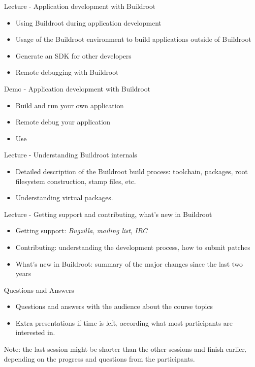 \documentclass[a4paper,12pt,obeyspaces,spaces,hyphens]{article}
\begin{document}
\feagendatwocolumn
{Lecture - Application development with Buildroot}
{
  \begin{itemize}
  \item Using Buildroot during application development
  \item Usage of the Buildroot environment to build applications
    outside of Buildroot
  \item Generate an SDK for other developers
  \item Remote debugging with Buildroot
  \end{itemize}
}
{Demo - Application development with Buildroot}
{
  \begin{itemize}
  \item Build and run your own application
  \item Remote debug your application
  \item Use 
  \end{itemize}
}

\feagendatwocolumn
{Lecture - Understanding Buildroot internals}
{
  \begin{itemize}
  \item Detailed description of the Buildroot build process:
    toolchain, packages, root filesystem construction, stamp files,
    etc.
  \item Understanding virtual packages.
  \end{itemize}
}
{Lecture - Getting support and contributing, what's new in Buildroot}
{
  \begin{itemize}
  \item Getting support: {\em Bugzilla}, {\em mailing list}, {\em IRC}
  \item Contributing: understanding the development process, how to
    submit patches
  \item What's new in Buildroot: summary of the major changes since
    the last two years
  \end{itemize}
}

\feagendaonecolumn
{Questions and Answers}
{
  \begin{itemize}
  \item Questions and answers with the audience about the course topics
  \item Extra presentations if time is left, according what most
        participants are interested in.
  \end{itemize}
}

Note: the last session might be shorter than the other sessions and
finish earlier, depending on the progress and questions from the
participants.
\end{document}
